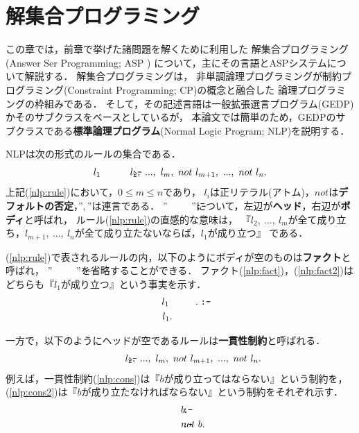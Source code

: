 \chapter{解集合プログラミング}\label{chap:asp}
この章では，前章で挙げた諸問題を解くために利用した
解集合プログラミング(Answer Ser Programming; ASP
\cite{%
  Hayama17,%
  Inoue08}
)
について，主にその言語とASPシステムについて解説する．
解集合プログラミングは，
非単調論理プログラミングが制約プログラミング(Constraint Programming; CP)の概念と融合した
論理プログラミングの枠組みである．\cite{Inoue08}
そして，その記述言語は一般拡張選言プログラム(GEDP)かそのサブクラスをベースとしているが，
本論文では簡単のため，GEDPのサブクラスである\textbf{標準論理プログラム}(Normal Logic Program; NLP)を説明する．

NLPは次の形式のルールの集合である．\\
\begin{equation}
  \label{nlp:rule}
l_1 ~\mcode{:-} ~l_2, ~..., ~l_m, ~not ~l_{m+1}, ~..., ~not ~l_{n}.
\end{equation}
上記(\ref{nlp:rule})において，$0 \leq m \leq n$であり，
$l_i$は正リテラル(アトム)，$not$は\textbf{デフォルトの否定}\cite{Sakama10}，”$,$”は連言である．
”$\mcode{:-}$”について，左辺が\textbf{ヘッド}，右辺が\textbf{ボディ}と呼ばれ，
ルール(\ref{nlp:rule})の直感的な意味は，
『$l_2, ~..., ~l_m$が全て成り立ち，$l_{m+1}, ~..., ~l_{n}$が全て成り立たないならば，$l_1$が成り立つ』
である．

(\ref{nlp:rule})で表されるルールの内，以下のようにボディが空のものは\textbf{ファクト}と呼ばれ，
”$\mcode{:-}$”を省略することができる．
ファクト(\ref{nlp:fact})，(\ref{nlp:fact2})はどちらも『$l_1$が成り立つ』という事実を示す．
\begin{eqnarray}
  \label{nlp:fact}
   l_1 ~&\mcode{:-}. \\
  \label{nlp:fact2}
   l_1.&
\end{eqnarray}

一方で，以下のようにヘッドが空であるルールは\textbf{一貫性制約}と呼ばれる．
\begin{equation}
  \mcode{:-} ~l_2, ~..., ~l_m, ~not ~l_{m+1}, ~..., ~not ~l_{n}.
\end{equation}
例えば，一貫性制約(\ref{nlp:cons})は『$b$が成り立ってはならない』という制約を，
(\ref{nlp:cons2})は『$b$が成り立たなければならない』という制約をそれぞれ示す．
\begin{eqnarray}
  \label{nlp:cons}
   \mcode{:-}& ~b.\\
  \label{nlp:cons2}
   \mcode{:-}& ~not ~b.
\end{eqnarray}

